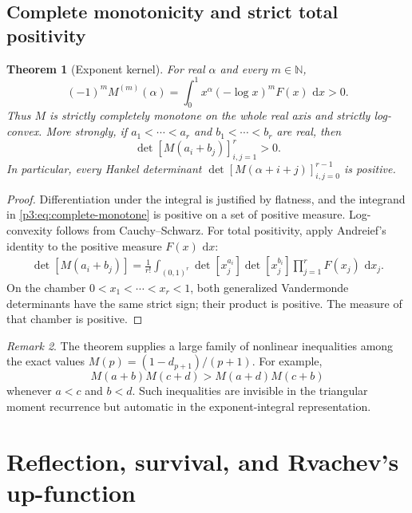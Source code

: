 \documentclass[11pt,oneside]{article}
\newtheorem{theorem}{Theorem}[section]
\theoremstyle{definition}
\theoremstyle{remark}
\newtheorem{remark}[theorem]{Remark}
\newcommand{\N}{\mathbb N}
\newcommand{\dd}{\,\mathrm d}
\newcommand{\1}{\mathbf 1}
\begin{document}
\subsection{Complete monotonicity and strict total positivity}

\begin{theorem}[Exponent kernel]
\label{p3:thm:total-positive}
For real $\alpha$ and every $m\in\N$,
\begin{equation}
 (-1)^mM^{(m)}(\alpha)
 =\int_0^1x^\alpha(-\log x)^mF(x)\,\dd x>0.                  \label{p3:eq:complete-monotone}
\end{equation}
Thus $M$ is strictly completely monotone on the whole real axis and strictly log-convex.
More strongly, if
\(a_1<\cdots<a_r\) and \(b_1<\cdots<b_r\) are real, then
\begin{equation}
 \det[M(a_i+b_j)]_{i,j=1}^r>0.                               \label{p3:eq:strict-TP}
\end{equation}
In particular, every Hankel determinant
$\det[M(\alpha+i+j)]_{i,j=0}^{r-1}$ is positive.
\end{theorem}

\begin{proof}
Differentiation under the integral is justified by flatness, and the integrand in
\eqref{p3:eq:complete-monotone} is positive on a set of positive measure.  Log-convexity follows
from Cauchy--Schwarz.  For total positivity, apply Andreief's identity to the positive
measure $F(x)\,\dd x$:
\begin{align*}
 \det[M(a_i+b_j)]
 =\frac1{r!}\int_{(0,1)^r}
 \det[x_j^{a_i}]\det[x_j^{b_i}]\prod_{j=1}^rF(x_j)\,\dd x_j.
\end{align*}
On the chamber $0<x_1<\cdots<x_r<1$, both generalized Vandermonde determinants have the
same strict sign; their product is positive.  The measure of that chamber is positive.
\end{proof}

\begin{remark}
The theorem supplies a large family of nonlinear inequalities among the exact values
$M(p)=(1-d_{p+1})/(p+1)$.  For example,
\[
 M(a+b)M(c+d)>M(a+d)M(c+b)
\]
whenever $a<c$ and $b<d$.  Such inequalities are invisible in the triangular moment
recurrence but automatic in the exponent-integral representation.
\end{remark}

\section{Reflection, survival, and Rvachev's up-function}
\label{p3:sec:up}
\end{document}
